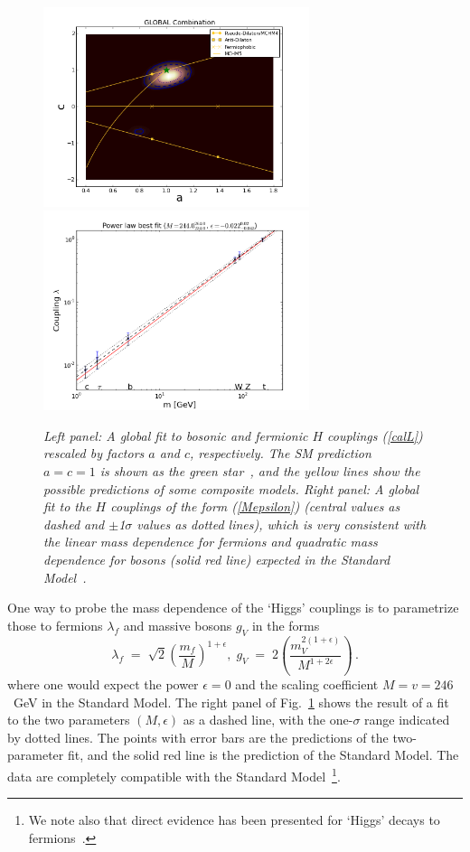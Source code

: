 \documentclass[12pt]{article}
\numberwithin{equation}{section}
\begin{document}
\begin{figure}[p]
\centering
\includegraphics[height=2.3in]{GLOBAL_Combination.png}
\includegraphics[height=2.3in]{Mass_dependence.png}
\caption{\it Left panel: A global fit to bosonic and fermionic $H$ couplings (\protect\ref{calL}) rescaled by factors $a$ and $c$, respectively.
The SM prediction $a = c = 1$ is shown as the green star~\protect\cite{EY3}, and the yellow lines
show the possible predictions of some composite models. Right panel: A global fit to the $H$ couplings of the form (\protect\ref{Mepsilon})
(central values as dashed and
$\pm$1$\sigma$ values as dotted lines), which is very consistent
with the linear mass dependence for fermions and quadratic mass dependence for bosons (solid
red line) expected in the Standard Model~\protect\cite{EY3}.}
\label{fig:EY}
\end{figure}

One way to probe the mass dependence of the `Higgs' couplings is to parametrize those to fermions $\lambda_f$
and massive bosons $g_V$ in the forms~\cite{EY3}
 \begin{equation}
\lambda_f \; = \; \sqrt{2} \left(\frac{m_f}{M}\right)^{1 + \epsilon}, \; g_V \; = \; 2 \left(\frac{m_V^{2(1 + \epsilon)}}{M^{1 + 2\epsilon}}\right) \, .
\label{Mepsilon}
\end{equation}
where one would expect the power $\epsilon = 0$ and the scaling
coefficient $M = v = 246$~GeV in the Standard Model. The right panel of Fig.~\ref{fig:EY} shows the result of a fit
to the two parameters $(M, \epsilon)$ as a dashed line,
with the one-$\sigma$ range indicated by dotted lines. The points with error bars are the predictions of
the two-parameter fit, and the solid red line is the
prediction of the Standard Model. The data are completely compatible with the Standard
Model~\footnote{We note also that direct evidence has been presented for `Higgs' decays to fermions~\cite{CMSf}.}.
\end{document}
